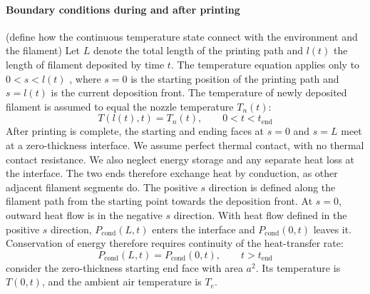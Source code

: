 \documentclass{article}
\begin{document}
\paragraph{Boundary conditions during and after printing}(define how the continuous temperature state connect with the environment and the filament)
Let $L$ denote the total length of the  printing path and $l(t)$ the length of filament deposited by time $t$.
The temperature equation applies only to $0<s<l(t)$ , where $s=0$ is the starting position of the printing path and $s=l(t)$ is the current deposition front.
The temperature of newly deposited filament is assumed to equal the nozzle temperature $T_n(t)$:
\begin{equation}
T(l(t),t)= T_n(t),
\qquad
0<t<t_{\mathrm{end}}
\end{equation}
After printing is complete, the starting and ending faces at $s=0$ and $s=L$ meet at a zero-thickness interface. We assume perfect thermal contact, with no thermal contact resistance. We also neglect energy storage and any separate heat loss at the interface. The two ends therefore exchange heat by conduction, as other adjacent filament segments do. The positive $s$ direction is defined along the filament path from the starting point towards the deposition front. At $s=0$, outward heat flow is in the negative $s$ direction. With heat flow defined in the positive $s$ direction, $P_{\mathrm{cond}}(L,t)$ enters the interface and $P_{\mathrm{cond}}(0,t)$ leaves it. Conservation of energy therefore requires continuity of the heat-transfer rate:
\begin{equation}
P_{\mathrm{cond}}(L,t)=P_{\mathrm{cond}}(0,t),
\qquad
t>t_{\mathrm{end}}
\end{equation}
consider the zero-thickness starting end face with area $a^2$. Its temperature is $T(0,t)$, and the ambient air temperature is $T_e$.
\end{document}
